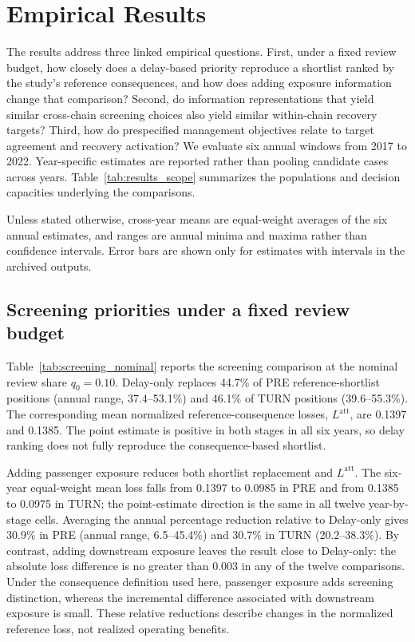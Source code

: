 \section{Empirical Results}
\label{sec:results}

The results address three linked empirical questions. First, under a fixed review budget, how closely does a delay-based priority reproduce a shortlist ranked by the study's reference consequences, and how does adding exposure information change that comparison? Second, do information representations that yield similar cross-chain screening choices also yield similar within-chain recovery targets? Third, how do prespecified management objectives relate to target agreement and recovery activation? We evaluate six annual windows from 2017 to 2022. Year-specific estimates are reported rather than pooling candidate cases across years. Table~\ref{tab:results_scope} summarizes the populations and decision capacities underlying the comparisons.

Unless stated otherwise, cross-year means are equal-weight averages of the six annual estimates, and ranges are annual minima and maxima rather than confidence intervals. Error bars are shown only for estimates with intervals in the archived outputs.

\subsection{Screening priorities under a fixed review budget}
\label{subsec:results_screening}

Table~\ref{tab:screening_nominal} reports the screening comparison at the nominal review share $q_0=0.10$. Delay-only replaces 44.7\% of PRE reference-shortlist positions (annual range, 37.4--53.1\%) and 46.1\% of TURN positions (39.6--55.3\%). The corresponding mean normalized reference-consequence losses, $L^{\mathrm{att}}$, are 0.1397 and 0.1385. The point estimate is positive in both stages in all six years, so delay ranking does not fully reproduce the consequence-based shortlist.

Adding passenger exposure reduces both shortlist replacement and $L^{\mathrm{att}}$. The six-year equal-weight mean loss falls from 0.1397 to 0.0985 in PRE and from 0.1385 to 0.0975 in TURN; the point-estimate direction is the same in all twelve year-by-stage cells. Averaging the annual percentage reduction relative to Delay-only gives 30.9\% in PRE (annual range, 6.5--45.4\%) and 30.7\% in TURN (20.2--38.3\%). By contrast, adding downstream exposure leaves the result close to Delay-only: the absolute loss difference is no greater than 0.003 in any of the twelve comparisons. Under the consequence definition used here, passenger exposure adds screening distinction, whereas the incremental difference associated with downstream exposure is small. These relative reductions describe changes in the normalized reference loss, not realized operating benefits.

